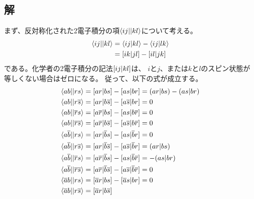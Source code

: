 \subsection{解}
まず、反対称化された2電子積分の項${\braket{ij||kl}}$について考える。
\begin{align}
	\antitwo{ij}{kl}
&=
	\phystwo{ij}{kl}
	-
	\phystwo{ij}{lk} \\
%
%
&=
	\chemtwo{ik}{jl}
	-
	\chemtwo{il}{jk}
\end{align}
である。化学者の2電子積分の記法${[ij|kl]}$は、
$i$と$j$、または$k$と$l$のスピン状態が等しくない場合はゼロになる。
従って、以下の式が成立する。
\begin{align}
	\antitwo{\aorb{a}\aorb{b}}{\aorb{r}\aorb{s}}
&=
	\chemtwo{\aorb{a}\aorb{r}}{\aorb{b}\aorb{s}}
	-
	\chemtwo{\aorb{a}\aorb{s}}{\aorb{b}\aorb{r}}
=
	\spacetwo{ar}{bs}
	-
	\spacetwo{as}{br} \\
%
%
	\antitwo{\aorb{a}\aorb{b}}{\aorb{r}\borb{s}}
&=
	\chemtwo{\aorb{a}\aorb{r}}{\aorb{b}\borb{s}}
	-
	\chemtwo{\aorb{a}\borb{s}}{\aorb{b}\aorb{r}}
=
	0 \\
%
%
	\antitwo{\aorb{a}\aorb{b}}{\borb{r}\aorb{s}}
&=
	\chemtwo{\aorb{a}\borb{r}}{\aorb{b}\aorb{s}}
	-
	\chemtwo{\aorb{a}\aorb{s}}{\aorb{b}\borb{r}}
=
	0 \\
%
%
	\antitwo{\aorb{a}\aorb{b}}{\borb{r}\borb{s}}
&=
	\chemtwo{\aorb{a}\borb{r}}{\aorb{b}\borb{s}}
	-
	\chemtwo{\aorb{a}\borb{s}}{\aorb{b}\borb{r}}
=
	0 \\
%
%
	\antitwo{\aorb{a}\borb{b}}{\aorb{r}\aorb{s}}
&=
	\chemtwo{\aorb{a}\aorb{r}}{\borb{b}\aorb{s}}
	-
	\chemtwo{\aorb{a}\aorb{s}}{\borb{b}\aorb{r}}
=
	0 \\
%
%
	\antitwo{\aorb{a}\borb{b}}{\aorb{r}\borb{s}}
&=
	\chemtwo{\aorb{a}\aorb{r}}{\borb{b}\borb{s}}
	-
	\chemtwo{\aorb{a}\borb{s}}{\borb{b}\aorb{r}}
=
	\spacetwo{ar}{bs} \\
%
%
	\antitwo{\aorb{a}\borb{b}}{\borb{r}\aorb{s}}
&=
	\chemtwo{\aorb{a}\borb{r}}{\borb{b}\aorb{s}}
	-
	\chemtwo{\aorb{a}\aorb{s}}{\borb{b}\borb{r}}
=
	-\spacetwo{as}{br} \\
%
%
	\antitwo{\aorb{a}\borb{b}}{\borb{r}\borb{s}}
&=
	\chemtwo{\aorb{a}\borb{r}}{\borb{b}\borb{s}}
	-
	\chemtwo{\aorb{a}\borb{s}}{\borb{b}\borb{r}}
=
	0 \\
%
%
	\antitwo{\borb{a}\aorb{b}}{\aorb{r}\aorb{s}}
&=
	\chemtwo{\borb{a}\aorb{r}}{\aorb{b}\aorb{s}}
	-
	\chemtwo{\borb{a}\aorb{s}}{\aorb{b}\aorb{r}}
=
	0 \\
%
%
	\antitwo{\borb{a}\aorb{b}}{\aorb{r}\borb{s}}
&=
	\chemtwo{\borb{a}\aorb{r}}{\aorb{b}\borb{s}}

\end{align}
